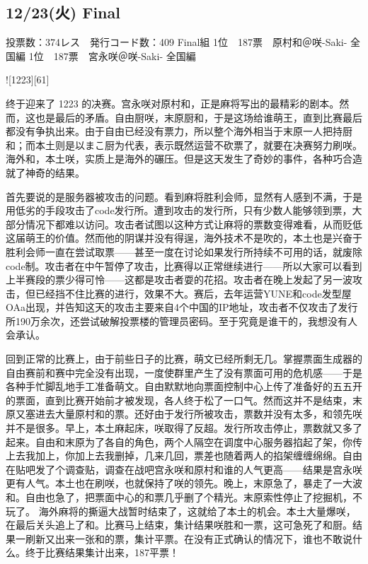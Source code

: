 \subsection{12/23(火) Final}

    投票数：374レス　発行コード数：409
    Final組
    1位　187票　原村和＠咲-Saki- 全国編
    1位　187票　宮永咲＠咲-Saki- 全国編

![1223][61]

终于迎来了 1223 的决赛。宫永咲对原村和，正是麻将写出的最精彩的剧本。然而，这也是最后的矛盾。自由厨咲，末原厨和，于是这场给谁萌王，直到比赛最后都没有争执出来。由于自由已经没有票力，所以整个海外相当于末原一人把持厨和；而本土则是以まこ厨为代表，表示既然运营不砍票了，就要在决赛努力刷咲。海外和，本土咲，实质上是海外的碾压。但是这天发生了奇妙的事件，各种巧合造就了神奇的结果。

首先要说的是服务器被攻击的问题。看到麻将胜利会师，显然有人感到不满，于是用低劣的手段攻击了code发行所。遭到攻击的发行所，只有少数人能够领到票，大部分情况下都难以访问。攻击者试图以这种方式让麻将的票数变得难看，从而贬低这届萌王的价值。然而他的阴谋并没有得逞，海外技术不是吹的，本土也是兴奋于胜利会师一直在尝试取票——甚至一度在讨论如果发行所持续不可用的话，就废除code制。攻击者在中午暂停了攻击，比赛得以正常继续进行——所以大家可以看到上半赛段的票少得可怜——这都是攻击者耍的花招。攻击者在晚上发起了另一波攻击，但已经挡不住比赛的进行，效果不大。赛后，去年运营YUNE和code发型屋OAa出现，并告知这天的攻击主要来自4个中国的IP地址，攻击者不仅攻击了发行所190万余次，还尝试破解投票楼的管理员密码。至于究竟是谁干的，我想没有人会承认。

回到正常的比赛上，由于前些日子的比赛，萌文已经所剩无几。掌握票面生成器的自由赛前和赛中完全没有出现，一度使群里产生了没有票面可用的危机感——于是各种手忙脚乱地手工准备萌文。自由默默地向票面控制中心上传了准备好的五五开的票面，直到比赛开始前才被发现，各人终于松了一口气。然而这并不是结束，末原又塞进去大量原村和的票。还好由于发行所被攻击，票数并没有太多，和领先咲并不是很多。早上，本土麻起床，咲取得了反超。发行所攻击停止，票数就又多了起来。自由和末原为了各自的角色，两个人隔空在调度中心服务器掐起了架，你传上去我加上，你加上去我删掉，几来几回，票差也随着两人的掐架缠缠绵绵。自由在贴吧发了个调查贴，调查在战吧宫永咲和原村和谁的人气更高——结果是宫永咲更有人气。本土也在刷咲，也就保持了咲的领先。晚上，末原急了，暴走了一大波和。自由也急了，把票面中心的和票几乎删了个精光。末原索性停止了挖掘机，不玩了。
海外麻将的撕逼大战暂时结束了，这就给了本土的机会。本土大量爆咲，在最后关头追上了和。比赛马上结束，集计结果咲胜和一票，这可急死了和厨。结果一刷新又出来一张和的票，集计平票。在没有正式确认的情况下，谁也不敢说什么。终于比赛结果集计出来，187平票！

